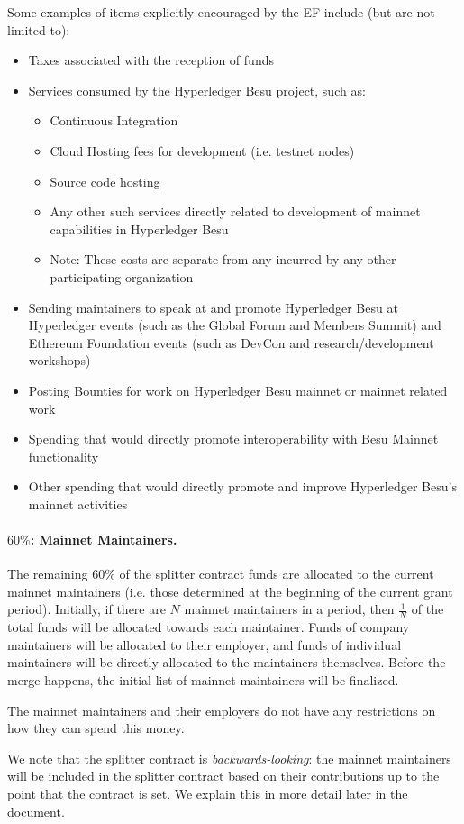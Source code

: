 \medskip
\noindent Some examples of items explicitly encouraged by the EF include (but are not limited to):
\begin{itemize}
\item Taxes associated with the reception of funds
\item Services consumed by the Hyperledger Besu project, such as:
\begin{itemize}
\item Continuous Integration
\item Cloud Hosting fees for development (i.e. testnet nodes)
\item Source code hosting
\item Any other such services directly related to development of mainnet capabilities in Hyperledger Besu
\item Note: These costs are separate from any incurred by any other participating organization
\end{itemize}
\item Sending maintainers to speak at and promote Hyperledger Besu at Hyperledger events (such as the Global Forum and Members Summit) and Ethereum Foundation events (such as DevCon and research/development workshops)
\item Posting Bounties for work on Hyperledger Besu mainnet or mainnet related work
\item Spending that would directly promote interoperability with Besu Mainnet functionality
\item Other spending that would directly promote and improve Hyperledger Besu’s mainnet activities
\end{itemize}

\paragraph{$60\%$:  \textbf{Mainnet Maintainers}.}  The remaining 60\% of the splitter contract funds are allocated to the current mainnet maintainers (i.e. those determined at the beginning of the current grant period).  Initially, if there are $N$ mainnet maintainers in a period, then $\frac{1}{N}$ of the total funds will be allocated towards each maintainer.  Funds of company maintainers will be allocated to their employer, and funds of individual maintainers will be directly allocated to the maintainers themselves.  Before the merge happens, the initial list of mainnet maintainers will be finalized.  

The mainnet maintainers and their employers do not have any restrictions on how they can spend this money.

We note that the splitter contract is \emph{backwards-looking}:  the mainnet maintainers will be included in the splitter contract based on their contributions up to the point that the contract is set.  We explain this in more detail later in the document.